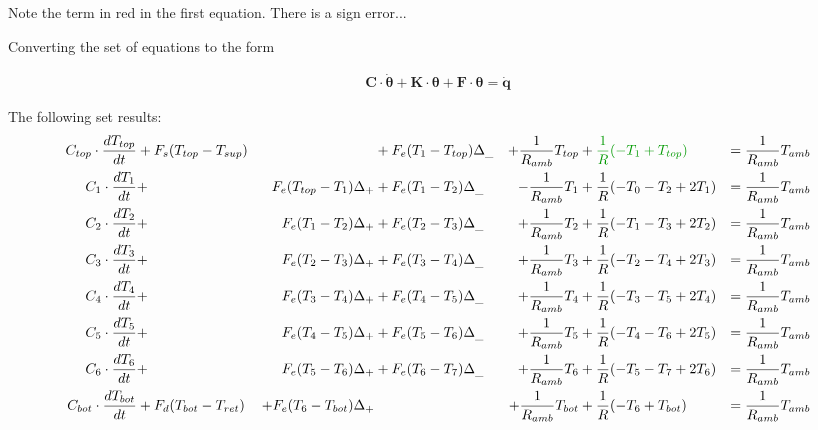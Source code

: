 \begin{scriptsize}
	Note the term in red in the first equation. There is a sign error...
	
	Converting the set of equations to the form
	
	\begin{subequations}
		\label{app:eq:matnot}
		\begin{align}
			\mathbf{C} \cdot \boldsymbol{\dot{\theta}} + \mathbf{K} \cdot \boldsymbol{\theta} + \mathbf{F} \cdot \boldsymbol{\theta}= \mathbf{\dot{q}}
		\end{align}
	\end{subequations}
	
	The following set results:
	\begin{equation}
		\begin{aligned}
			C_{top} \cdot \frac{dT_{top}}{dt} &+F_s (T_{top} - T_{sup}) &&+ F_e (T_1 - T_{top}) \Delta_{\_} &+ \frac{1}{R_{amb}} T_{top} &+ {\color{darkgreen}\frac{1}{R} (-T_1 + T_{top})}  &= \frac{1}{R_{amb}} T_{amb} \\
			C_1 \cdot \frac{dT_1}{dt} &+ &F_e (T_{top} - T_1) \Delta_{+} &+ F_e (T_1 - T_2) \Delta_{\_} &- \frac{1}{R_{amb}} T_1 &+ \frac{1}{R} (-T_0 -T_2 + 2 T_1) &= \frac{1}{R_{amb}} T_{amb}\\
			C_2 \cdot \frac{dT_2}{dt} &+ &F_e (T_1 - T_2) \Delta_{+} &+ F_e (T_2 - T_3) \Delta_{\_} &+ \frac{1}{R_{amb}} T_2 &+ \frac{1}{R} (-T_1 -T_3 + 2 T_2) &= \frac{1}{R_{amb}} T_{amb}\\
			C_3 \cdot \frac{dT_3}{dt} &+ &F_e (T_2 - T_3) \Delta_{+} &+ F_e (T_3 - T_4) \Delta_{\_} &+ \frac{1}{R_{amb}} T_3 &+ \frac{1}{R} (-T_2 - T_4 + 2 T_3) &= \frac{1}{R_{amb}} T_{amb}\\
			C_4 \cdot \frac{dT_4}{dt} &+ &F_e (T_3 - T_4) \Delta_{+} &+ F_e (T_4 - T_5) \Delta_{\_} &+ \frac{1}{R_{amb}} T_4 &+ \frac{1}{R} (-T_3 - T_5 + 2 T_4) &= \frac{1}{R_{amb}} T_{amb}\\
			C_5 \cdot \frac{dT_5}{dt} &+ &F_e (T_4 - T_5) \Delta_{+} &+ F_e (T_5 - T_6) \Delta_{\_} &+ \frac{1}{R_{amb}} T_5 &+ \frac{1}{R} (-T_4 - T_6 + 2 T_5) &= \frac{1}{R_{amb}} T_{amb}\\
			C_6 \cdot \frac{dT_6}{dt} &+ &F_e (T_5 - T_6) \Delta_{+} &+ F_e (T_6 - T_7) \Delta_{\_} &+ \frac{1}{R_{amb}} T_6 &+ \frac{1}{R} (-T_5 - T_7 + 2 T_6) &= \frac{1}{R_{amb}} T_{amb}\\
			C_{bot} \cdot \frac{dT_{bot}}{dt} &+ F_d (T_{bot} - T_{ret}) &+ F_e (T_6 - T_{bot}) \Delta_{+} &&+ \frac{1}{R_{amb}} T_{bot} &+ \frac{1}{R} (-T_6 + T_{bot}) &= \frac{1}{R_{amb}} T_{amb}\\
		\end{aligned}
	\end{equation}
	

\end{scriptsize}
